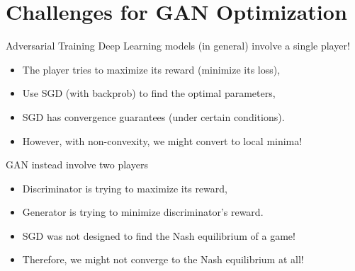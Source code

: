 %

%
\section{Challenges for GAN Optimization}



\begin{frame} {Adversarial Training}  
  \vspace{2mm}
Deep Learning models (in general) involve a single player!
  \vspace{1mm}
  \begin{itemize}
    \item The player tries to maximize its reward (minimize its loss),
    \item Use SGD (with backprob) to find the optimal parameters,
    \item SGD has convergence guarantees (under certain conditions).
    \item However, with non-convexity, we might convert to local minima!
  \end{itemize}
    \vspace{3mm} 
GAN instead involve two players
     \vspace{1mm}
  \begin{itemize}
    \item Discriminator is trying to maximize its reward,
    \item Generator is trying to minimize discriminator's reward.
    \item  SGD was not designed to find the Nash equilibrium of a game!
    \item Therefore, we might not converge to the Nash equilibrium at all!
  \end{itemize}
  \vspace{2mm}
      
 \end{frame}
 
 
% 

